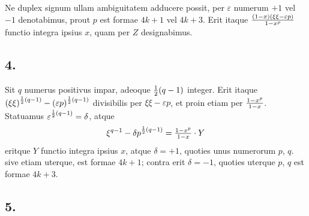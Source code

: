 \documentclass[twoside,12pt, showframe]{memoir}
\let\oldfrac\frac
\def\frac#1#2{\mathchoice{\tfrac{#1}{#2}}{\oldfrac{#1}{#2}}{\genfrac{}{}{}{2}{#1}{#2\mathstrut}}{\genfrac{}{}{}{3}{#1}{#2\mathstrut}}}
\begin{document}
Ne duplex signum ullam ambiguitatem adducere possit, per \(\varepsilon\) numerum \(+1\) vel \(-1\) denotabimus, prout \(p\) est formae \(4 k+1\) vel \(4 k+3\). Erit itaque \(\frac{(1-x)(\xi \xi-\varepsilon p)}{1-x^{p}}\) functio integra ipsius \(x\), quam per \(Z\) designabimus.

\subsection*{4.}
 
Sit \(q\) numerus positivus impar, adeoque \(\frac{1}{2}(q-1)\) integer. Erit itaque \((\xi \xi)^{\frac{1}{2}(q-1)}-(\varepsilon p)^{\frac{1}{2}(q-1)}\) divisibilis per \(\xi \xi-\varepsilon p\), et proin etiam per \(\frac{1-x^{p}}{1-x}\). Statuamus \(\varepsilon^{\frac{1}{2}(q-1)}=\delta\), atque
\[\xi^{q-1}-\delta p^{\frac{1}{2}(q-1)}=\frac{1-x^{p}}{1-x} \cdot Y\]
eritque \(Y\) functio integra ipsius \(x\), atque \(\delta=+1\), quoties unus numerorum \(p\), \(q\). sive etiam uterque, est formae \(4 k+1\); contra erit \(\delta=-1\), quoties uterque \(p\), \(q\) est formae \(4 k+3\).

\subsection*{5.}
 
\end{document}

